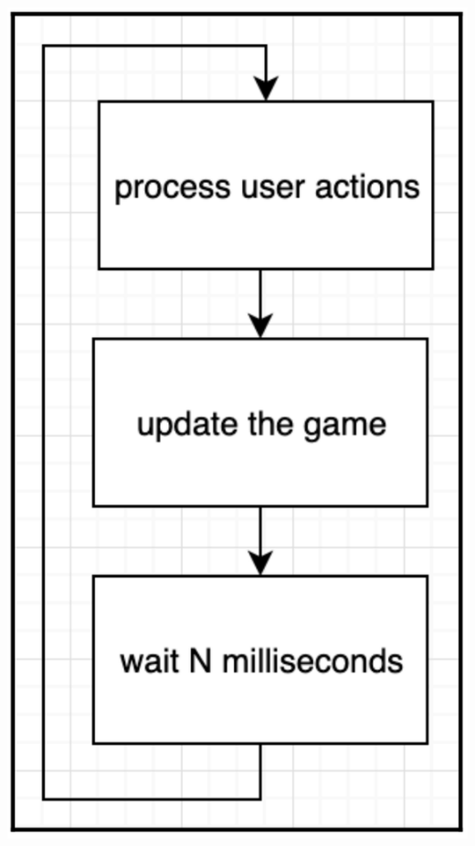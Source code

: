 \begin{center}
	\includegraphics[width=1.0\textwidth]{content/Section-2/Chapter-11/12}
\end{center}

